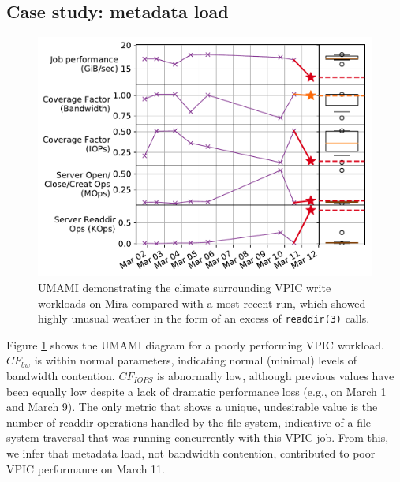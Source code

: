 {%
\subsection{Case study: metadata load}

\begin{figure}[t]
    \centering
    \includegraphics[width=1.0\columnwidth]{figs/umami-mira-fs1-vpic-write.pdf}
    \vspace{-.25in}
    \caption{UMAMI demonstrating the climate surrounding VPIC write workloads on Mira compared with a most recent run, which showed highly unusual weather in the form of an excess of \texttt{readdir(3)} calls.
    }
    \label{fig:umami-mira-fs1-vpic-write}
	\vspace{-.15in}
\end{figure}

Figure \ref{fig:umami-mira-fs1-vpic-write} shows the UMAMI diagram for a poorly performing VPIC workload.
$\mathit{CF}_{\mathit{bw}}$ is within normal parameters, indicating normal (minimal) levels of bandwidth contention.
$\mathit{CF}_{\mathit{IOPS}}$ is abnormally low, although previous values have been equally low despite a lack of dramatic performance loss (e.g., on March 1 and March 9).
The only metric that shows a unique, undesirable value is the number of readdir operations handled by the file system, indicative of a file system traversal that was running concurrently with this VPIC job.   From this, we infer that metadata load, not bandwidth contention, contributed to poor VPIC performance on March 11.

}
